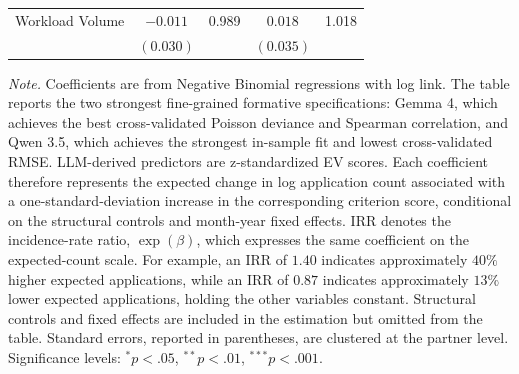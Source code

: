 \begin{table}[htbp]
\begin{tabular}{lcccc}
Workload Volume             
    & $-0.011$ & 0.989 & $0.018$ & 1.018 \\
    & $(0.030)$ &      & $(0.035)$ &      \\

\bottomrule
\end{tabular}

\begin{flushleft}
\footnotesize
\textit{Note.} Coefficients are from Negative Binomial regressions with log link. The table reports the two strongest fine-grained formative specifications: Gemma 4, which achieves the best cross-validated Poisson deviance and Spearman correlation, and Qwen 3.5, which achieves the strongest in-sample fit and lowest cross-validated RMSE. LLM-derived predictors are z-standardized EV scores. Each coefficient therefore represents the expected change in log application count associated with a one-standard-deviation increase in the corresponding criterion score, conditional on the structural controls and month-year fixed effects. IRR denotes the incidence-rate ratio, $\exp(\beta)$, which expresses the same coefficient on the expected-count scale. For example, an IRR of $1.40$ indicates approximately $40\%$ higher expected applications, while an IRR of $0.87$ indicates approximately $13\%$ lower expected applications, holding the other variables constant. Structural controls and fixed effects are included in the estimation but omitted from the table. Standard errors, reported in parentheses, are clustered at the partner level. Significance levels: $^{*}p < .05$, $^{**}p < .01$, $^{***}p < .001$.
\end{flushleft}
\end{table}

